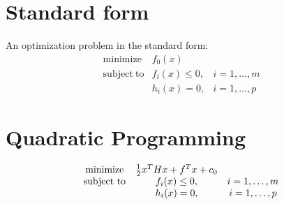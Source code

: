 
\section{Standard form}
An optimization problem in the standard form\cite{BoydVandenberghe2004}:
\begin{equation}
\begin{matrix}
\mathrm{minimize} &f_{0}(x)&\\
\mathrm{subject~ to} &f_{i}(x)\leq0, &i=1,\dots,m\\
&h_{i}(x)=0, &i=1,\dots,p
\end{matrix}
\end{equation}


\section{Quadratic Programming}
\begin{equation}
\begin{matrix}
\mathrm{minimize} &{1\over2}x^{T}Hx+f^{T}x+c_{0}&\\
\mathrm{subject~ to} &f_{i}(x)\leq0, &i=1,\dots,m\\
&h_{i}(x)=0, &i=1,\dots,p
\end{matrix}
\end{equation}


